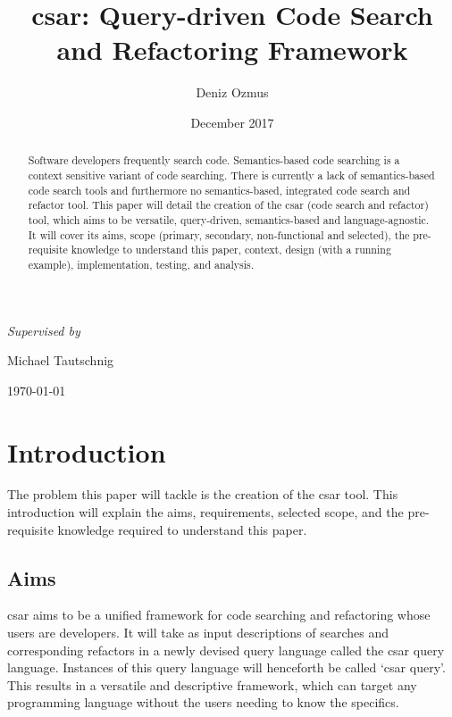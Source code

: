 \documentclass[12pt, letterpaper]{article}
\title{csar: Query-driven Code Search and Refactoring Framework}
\author{Deniz Ozmus}
\date{December 2017}
\def \supervisor {Michael Tautschnig}
\begin{document}
\begin{titlepage}
  \centering
  {\Large \MyTitle\par}
  \vspace{5cm}
  {\MyAuthor\par}
  \vspace{0.5cm}
  {\itshape Supervised by }{ \supervisor\par}
  \vspace{12cm}
  {\today\par}
\end{titlepage}

\begin{abstract}
  Software developers frequently search code.
  Semantics-based code searching is a context sensitive variant of code searching.
  There is currently a lack of semantics-based code search tools and furthermore no semantics-based, integrated code search and refactor tool.
  This paper will detail the creation of the csar (code search and refactor) tool, which aims to be versatile, query-driven, semantics-based and language-agnostic.
  It will cover its aims, scope (primary, secondary, non-functional and selected), the pre-requisite knowledge to understand this paper, context, design (with a running example), implementation, testing, and analysis.
\end{abstract}
\newpage

\tableofcontents
\newpage

\section{Introduction}
The problem this paper will tackle is the creation of the csar tool.
This introduction will explain the aims, requirements, selected scope, and the pre-requisite knowledge required to understand this paper.

\subsection{Aims}
csar aims to be a unified framework for code searching and refactoring whose users are developers.
It will take as input descriptions of searches and corresponding refactors in a newly devised query language called the csar query language.
Instances of this query language will henceforth be called `csar query'.
This results in a versatile and descriptive framework, which can target any programming language without the users needing to know the specifics.
\end{document}
